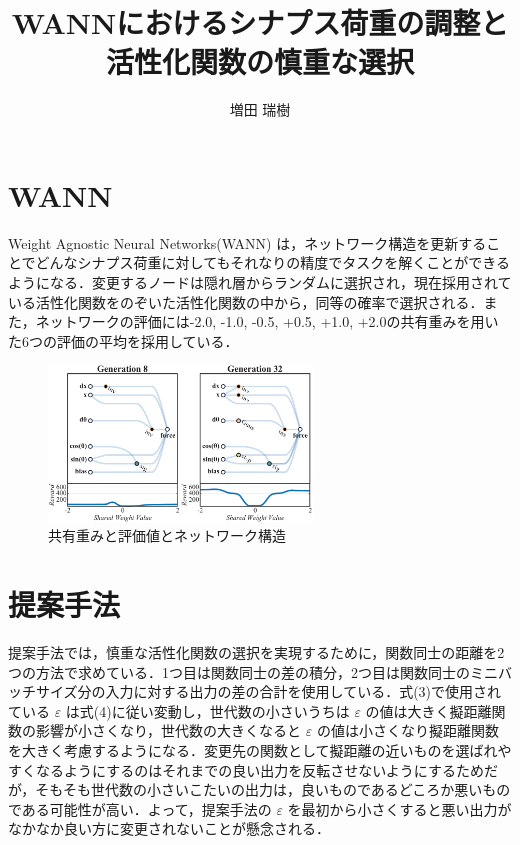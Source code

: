 \documentclass[dvipdfmx]{jarticle}
\title{WANNにおけるシナプス荷重の調整と活性化関数の慎重な選択}
\author{増田 瑞樹}
\begin{document}
\maketitle

\section{WANN}
Weight Agnostic Neural Networks(WANN) は，ネットワーク構造を更新することでどんなシナプス荷重に対してもそれなりの精度でタスクを解くことができるようになる．変更するノードは隠れ層からランダムに選択され，現在採用されている活性化関数をのぞいた活性化関数の中から，同等の確率で選択される．また，ネットワークの評価には-2.0, -1.0, -0.5, +0.5, +1.0, +2.0の共有重みを用いた6つの評価の平均を採用している．

\begin{figure}[h]
    \centering
    \includegraphics[width=70mm]{img/img01.png}
    \caption{共有重みと評価値とネットワーク構造}
\end{figure}

\section{提案手法}
提案手法では，慎重な活性化関数の選択を実現するために，関数同士の距離を2つの方法で求めている．1つ目は関数同士の差の積分，2つ目は関数同士のミニバッチサイズ分の入力に対する出力の差の合計を使用している．式(3)で使用されている $\varepsilon$ は式(4)に従い変動し，世代数の小さいうちは $\varepsilon$ の値は大きく擬距離関数の影響が小さくなり，世代数の大きくなると $\varepsilon$ の値は小さくなり擬距離関数を大きく考慮するようになる．変更先の関数として擬距離の近いものを選ばれやすくなるようにするのはそれまでの良い出力を反転させないようにするためだが，そもそも世代数の小さいこたいの出力は，良いものであるどころか悪いものである可能性が高い．よって，提案手法の $\varepsilon$ を最初から小さくすると悪い出力がなかなか良い方に変更されないことが懸念される．
\end{document}
